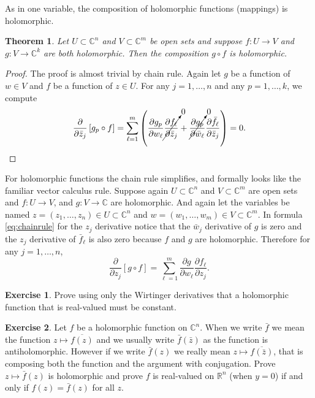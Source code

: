 \documentclass[12pt,openany]{book}
\newcommand{\C}{{\mathbb{C}}}
\newcommand{\R}{{\mathbb{R}}}
\theoremstyle{plain}
\newtheorem{thm}{Theorem}[section]
\theoremstyle{remark}
\theoremstyle{definition}
\newenvironment{exbox}{%
    \def\FrameCommand{\vrule width 1pt \relax\hspace {10pt}}%
    \MakeFramed {\advance \hsize -\width \FrameRestore }%
}{%
    \endMakeFramed
}
\theoremstyle{exercise}
\newtheorem{exercise}{Exercise}[section]
\theoremstyle{example}
\begin{document}
As in one variable, the composition of holomorphic functions (mappings) is
holomorphic.

\begin{thm}
Let $U \subset \C^n$ and $V \subset \C^m$ be open sets and suppose
$f \colon U \to V$ and $g \colon V \to \C^k$ are both holomorphic.
%
Then the composition $g \circ f$ is holomorphic.
\end{thm}

\begin{proof}
The proof is almost trivial by chain rule.
Again let $g$ be a function of $w \in V$ and $f$ be a function of $z \in U$.
For any $j = 1,\ldots,n$ and any $p=1,\ldots,k$, we compute
\begin{equation*}
\frac{\partial}{\partial \bar{z}_j} \left[ g_p \circ f \right]
=
\sum_{\ell=1}^m 
\left(
\frac{\partial g_p}{\partial w_\ell} 
\cancelto{0}{\frac{\partial f_\ell}{\partial \bar{z}_j}}
+
\cancelto{0}{\frac{\partial g_p}{\partial \bar{w}_\ell}}
\frac{\partial \bar{f}_\ell}{\partial \bar{z}_j} 
\right)
=
0 . \qedhere
\end{equation*}
\end{proof}

For holomorphic functions the chain rule simplifies, and formally looks
like the familiar vector calculus rule.
Suppose again
$U \subset \C^n$ and $V \subset \C^m$ are open sets and 
$f \colon U \to V$, and $g \colon V \to \C$ are holomorphic.
And again let the variables be named
$z = (z_1,\ldots,z_n) \in U \subset \C^n$ and $w = (w_1,\ldots,w_m) \in V
\subset \C^m$.  In formula \eqref{eq:chainrule} for the $z_j$ derivative
notice that 
the $\bar{w}_j$ derivative of $g$ is zero and the $z_j$ derivative of
$\bar{f}_\ell$ is also zero because $f$ and $g$ are holomorphic.
Therefore for any $j=1,\ldots,n$,
\begin{equation*}
\frac{\partial}{\partial z_j} \left[ g \circ f \right]
=
\sum_{\ell=1}^m 
\frac{\partial g}{\partial w_\ell}
\frac{\partial f_\ell}{\partial z_j} .
\end{equation*}

\begin{exbox}
\begin{exercise}
Prove using only the Wirtinger derivatives that a holomorphic function
that is real-valued must be constant.
\end{exercise}

\begin{exercise}
Let $f$ be a holomorphic function on $\C^n$.
When we write $\bar{f}$ we mean the function $z \mapsto \overline{f(z)}$
and we usually write $\bar{f}(\bar{z})$ as the function is antiholomorphic.
However if we write $\bar{f}(z)$ we really mean $z \mapsto \overline{f(\bar{z})}$,
that is composing both the function and the argument with conjugation.
Prove $z \mapsto \bar{f}(z)$ is holomorphic and prove $f$ is
real-valued on $\R^n$ (when $y=0$) if and only if $f(z) =
\bar{f}(z)$ for all $z$.
\end{exercise}
\end{exbox}
\end{document}
